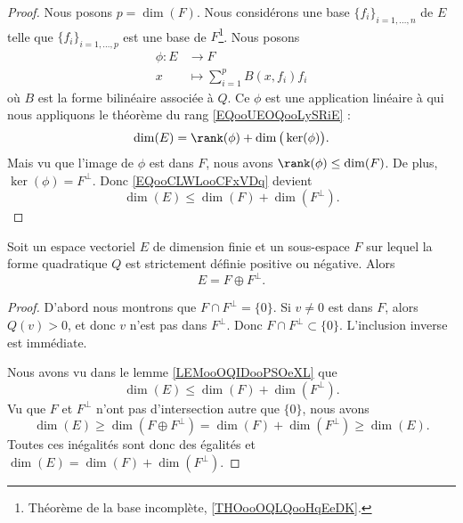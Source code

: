 \begin{proof}
	Nous posons \( p=\dim(F)\). Nous considérons une base \( \{ f_i \}_{i=1,\ldots, n}\) de \( E\) telle que \( \{ f_i \}_{i=1,\ldots, p}\) est une base de \( F\)\footnote{Théorème de la base incomplète, \ref{THOooOQLQooHqEeDK}.}. Nous posons
	\begin{equation}
		\begin{aligned}
			\phi\colon E & \to F                           \\
			x            & \mapsto \sum_{i=1}^pB(x,f_i)f_i
		\end{aligned}
	\end{equation}
	où \( B\) est la forme bilinéaire associée à \( Q\). Ce \( \phi\) est une application linéaire à qui nous appliquons le théorème du rang \eqref{EQooUEOQooLySRiE} :
	\begin{equation}        \label{EQooCLWLooCFxVDq}
		\dim(E)=\rank(\phi)+\dim\big( \ker(\phi) \big).
	\end{equation}
	Mais vu que l'image de \( \phi\) est dans \( F\), nous avons \( \rank(\phi)\leq \dim(F)\). De plus, \( \ker(\phi)=F^{\perp}\). Donc \eqref{EQooCLWLooCFxVDq} devient
	\begin{equation}
		\dim(E)\leq \dim(F)+\dim(F^{\perp}).
	\end{equation}
\end{proof}

\begin{lemma}     \label{LEMooUOZOooYvEcji}
	Soit un espace vectoriel \( E\) de dimension finie et un sous-espace \( F\) sur lequel la forme quadratique \( Q\) est strictement définie positive ou négative. Alors
	\begin{equation}
		E=F\oplus F^{\perp}.
	\end{equation}
\end{lemma}

\begin{proof}
	D'abord nous montrons que \( F\cap F^{\perp}=\{ 0 \}\). Si \( v\neq 0\) est dans \( F\), alors \( Q(v)>0\), et donc \( v\) n'est pas dans \( F^{\perp}\). Donc \( F\cap F^{\perp}\subset \{ 0 \}\). L'inclusion inverse est immédiate.

	Nous avons vu dans le lemme \ref{LEMooOQIDooPSOeXL} que
	\begin{equation}
		\dim(E)\leq \dim(F)+\dim(F^{\perp}).
	\end{equation}
	Vu que \( F\) et \( F^{\perp}\) n'ont pas d'intersection autre que \( \{ 0 \}\), nous avons
	\begin{equation}
		\dim(E)\geq\dim(F\oplus F^{\perp}) = \dim(F)+\dim(F^{\perp}) \geq\dim(E).
	\end{equation}
	Toutes ces inégalités sont donc des égalités et \( \dim(E)=\dim(F)+\dim(F^{\perp})\).
\end{proof}



